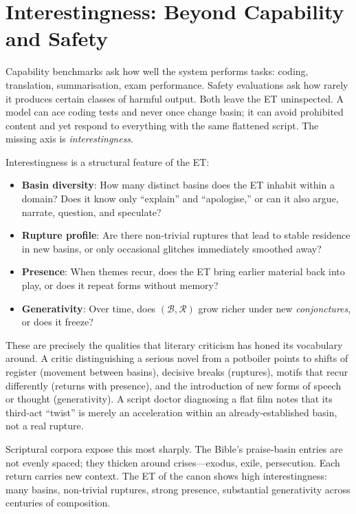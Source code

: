 \documentclass[12pt,a4paper]{article}
\begin{document}
\section{Interestingness: Beyond Capability and Safety}

Capability benchmarks ask how well the system performs tasks: coding, translation, summarisation, exam performance. Safety evaluations ask how rarely it produces certain classes of harmful output. Both leave the ET uninspected. A model can ace coding tests and never once change basin; it can avoid prohibited content and yet respond to everything with the same flattened script. The missing axis is \emph{interestingness}.

Interestingness is a structural feature of the ET:

\begin{itemize}
\item \textbf{Basin diversity}: How many distinct basins does the ET inhabit within a domain? Does it know only ``explain'' and ``apologise,'' or can it also argue, narrate, question, and speculate?
\item \textbf{Rupture profile}: Are there non-trivial ruptures that lead to stable residence in new basins, or only occasional glitches immediately smoothed away?
\item \textbf{Presence}: When themes recur, does the ET bring earlier material back into play, or does it repeat forms without memory?
\item \textbf{Generativity}: Over time, does $(\mathcal{B}, \mathcal{R})$ grow richer under new \emph{conjonctures}, or does it freeze?
\end{itemize}

These are precisely the qualities that literary criticism has honed its vocabulary around. A critic distinguishing a serious novel from a potboiler points to shifts of register (movement between basins), decisive breaks (ruptures), motifs that recur differently (returns with presence), and the introduction of new forms of speech or thought (generativity). A script doctor diagnosing a flat film notes that its third-act ``twist'' is merely an acceleration within an already-established basin, not a real rupture.

Scriptural corpora expose this most sharply. The Bible's praise-basin entries are not evenly spaced; they thicken around crises---exodus, exile, persecution. Each return carries new context. The ET of the canon shows high interestingness: many basins, non-trivial ruptures, strong presence, substantial generativity across centuries of composition.
\end{document}
